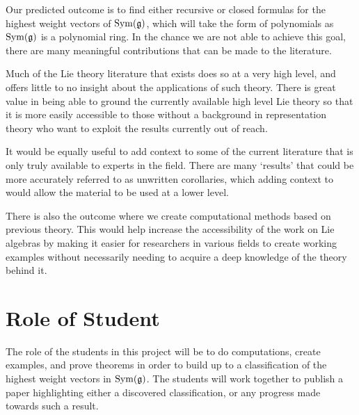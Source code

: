 \documentclass[11pt, reqno]{amsart}
\begin{document}
Our predicted outcome is to find either recursive or closed formulas for the highest weight vectors of $\operatorname{Sym}(\mathfrak{g})$, which will take the form of polynomials as $\operatorname{Sym}(\mathfrak{g})$ is a polynomial ring. In the chance we are not able to achieve this goal, there are many meaningful contributions that can be made to the literature.

Much of the Lie theory literature that exists does so at a very high level, and offers little to no insight about the applications of such theory. There is great value in being able to ground the currently available high level Lie theory so that it is more easily accessible to those without a background in representation theory who want to exploit the results currently out of reach.

It would be equally useful to add context to some of the current literature that is only truly available to experts in the field. There are many `results' that could be more accurately referred to as unwritten corollaries, which adding context to would allow the material to be used at a lower level.

There is also the outcome where we create computational methods based on previous theory. This would help increase the accessibility of the work on Lie algebras by making it easier for researchers in various fields to create working examples without necessarily needing to acquire a deep knowledge of the theory behind it.





\section{Role of Student}

The role of the students in this project will be to do computations, create examples, and prove theorems in order to build up to a classification of the highest weight vectors in $\operatorname{Sym}(\mathfrak{g})$. The students will work together to publish a paper highlighting either a discovered classification, or any progress made towards such a result. 
\end{document}
